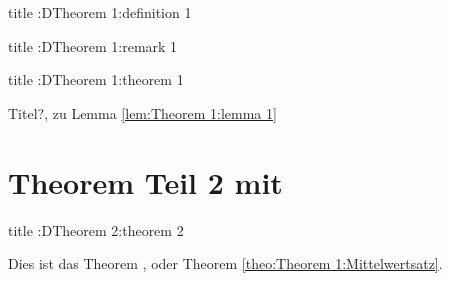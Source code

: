 \begin{definition}{title :D}{Theorem 1:definition 1}%
	\lipsum[1-1]
\end{definition}%
\begin{remark}{title :D}{Theorem 1:remark 1}%
	\lipsum[1-1]
\end{remark}%

\begin{theorem}{title :D}{Theorem 1:theorem 1}%
	\lipsum[1-1]
\end{theorem}%
\begin{proof*}{Titel?, zu Lemma \ref{lem:Theorem 1:lemma 1}}%
	\lipsum[1-1]
\end{proof*}

\chapter{Theorem Teil 2 mit \texorpdfstring{}{tcolorbox}}%
\label{chap:Theorem 2}%
\begin{theorem}{title :D}{Theorem 2:theorem 2}%
	\lipsum[1-1]
\end{theorem}%
Dies ist das Theorem , oder Theorem \ref{theo:Theorem 1:Mittelwertsatz}. \lipsum[1-1]%
\newpage%
\layout%
\newpage%


\newpage%
\AfterCalculatingTypearea{%
	\TUMAfterCalculatingTypearea%
}\recalctypearea%
